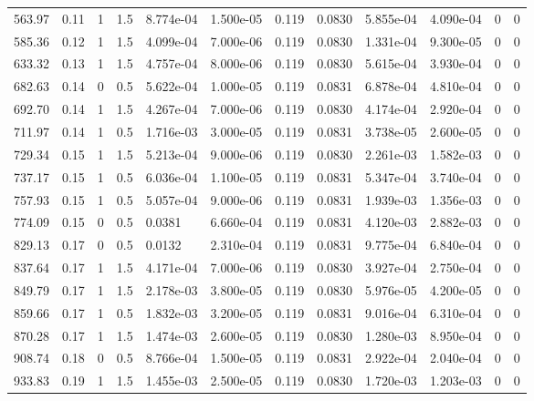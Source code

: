 \documentclass[preview]{standalone}
\begin{document}
{{\begin{tabular}{L{1.2cm}C{1.2cm} C{0.3cm}C{0.5cm} C{1.4cm}C{1.4cm} C{1.4cm}C{1.4cm} C{1.6cm}C{1.6cm} C{1.6cm}C{1.6cm}}
  563.97  &  0.11  & 1     & 1.5 &  8.774e-04  & 1.500e-05  &  0.119&   0.0830& 5.855e-04 & 4.090e-04   &  0 & 0  \\ 
  585.36  &  0.12  & 1     & 1.5 &  4.099e-04  & 7.000e-06  &  0.119&   0.0830& 1.331e-04 & 9.300e-05   &  0 & 0  \\ 
  633.32  &  0.13  & 1     & 1.5 &  4.757e-04  & 8.000e-06  &  0.119&   0.0830& 5.615e-04 & 3.930e-04   &  0 & 0  \\ 
  682.63  &  0.14  & 0     & 0.5 &  5.622e-04  & 1.000e-05  &  0.119&   0.0831& 6.878e-04 & 4.810e-04   &  0 & 0  \\ 
  692.70  &  0.14  & 1     & 1.5 &  4.267e-04  & 7.000e-06  &  0.119&   0.0830& 4.174e-04 & 2.920e-04   &  0 & 0  \\ 
  711.97  &  0.14  & 1     & 0.5 &  1.716e-03  & 3.000e-05  &  0.119&   0.0831& 3.738e-05 & 2.600e-05   &  0 & 0  \\ 
  729.34  &  0.15  & 1     & 1.5 &  5.213e-04  & 9.000e-06  &  0.119&   0.0830& 2.261e-03 & 1.582e-03   &  0 & 0  \\ 
  737.17  &  0.15  & 1     & 0.5 &  6.036e-04  & 1.100e-05  &  0.119&   0.0831& 5.347e-04 & 3.740e-04   &  0 & 0  \\ 
  757.93  &  0.15  & 1     & 0.5 &  5.057e-04  & 9.000e-06  &  0.119&   0.0831& 1.939e-03 & 1.356e-03   &  0 & 0  \\ 
  774.09  &  0.15  & 0     & 0.5 &  0.0381  & 6.660e-04  &  0.119&   0.0831& 4.120e-03 & 2.882e-03   &  0 & 0  \\ 
  829.13  &  0.17  & 0     & 0.5 &  0.0132  & 2.310e-04  &  0.119&   0.0831& 9.775e-04 & 6.840e-04   &  0 & 0  \\ 
  837.64  &  0.17  & 1     & 1.5 &  4.171e-04  & 7.000e-06  &  0.119&   0.0830& 3.927e-04 & 2.750e-04   &  0 & 0  \\ 
  849.79  &  0.17  & 1     & 1.5 &  2.178e-03  & 3.800e-05  &  0.119&   0.0830& 5.976e-05 & 4.200e-05   &  0 & 0  \\ 
  859.66  &  0.17  & 1     & 0.5 &  1.832e-03  & 3.200e-05  &  0.119&   0.0831& 9.016e-04 & 6.310e-04   &  0 & 0  \\ 
  870.28  &  0.17  & 1     & 1.5 &  1.474e-03  & 2.600e-05  &  0.119&   0.0830& 1.280e-03 & 8.950e-04   &  0 & 0  \\ 
  908.74  &  0.18  & 0     & 0.5 &  8.766e-04  & 1.500e-05  &  0.119&   0.0831& 2.922e-04 & 2.040e-04   &  0 & 0  \\ 
  933.83  &  0.19  & 1     & 1.5 &  1.455e-03  & 2.500e-05  &  0.119&   0.0830& 1.720e-03 & 1.203e-03   &  0 & 0  \\ 

\end{tabular}}}
\end{document}
